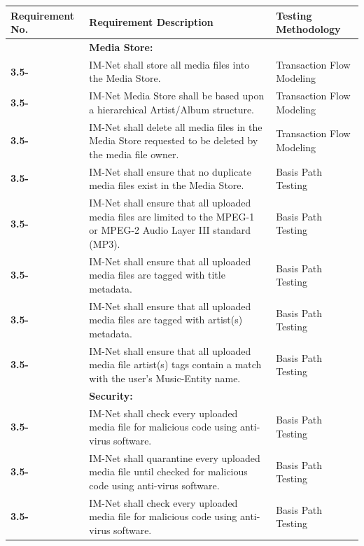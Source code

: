 \documentclass[letterpaper,12pt]{article}
\newcounter{rcounter}							%
\newcommand\rnumber{\stepcounter{rcounter}\arabic{rcounter}}
\begin{document}
{\begin{center}
\begin{tabular}{|l|p{4in}|p{2in}|}
\end{tabular} 
\end{center}

\setcounter{rcounter}{0}
\begin{center}
\begin{tabular}{|l|p{4in}|p{2in}|}
\hline 
Requirement No. & Requirement Description & Testing Methodology \\
\hline
& \textbf{Media Store:} & \\
\hline
\textbf{3.5-\rnumber} & IM-Net shall store all media files into the Media Store. & Transaction Flow Modeling \\ 
\hline
\textbf{3.5-\rnumber} & IM-Net Media Store shall be based upon a hierarchical Artist/Album structure. & Transaction Flow Modeling \\ 
\hline
\textbf{3.5-\rnumber} & IM-Net shall delete all media files in the Media Store requested to be deleted by the media file owner. & Transaction Flow Modeling \\ 
\hline
\textbf{3.5-\rnumber} & IM-Net shall ensure that no duplicate media files exist in the Media Store. & Basis Path Testing \\ 
\hline
\textbf{3.5-\rnumber} & IM-Net shall ensure that all uploaded media files are limited to the MPEG-1 or MPEG-2 Audio Layer III standard (MP3). & Basis Path Testing \\ 
\hline
\textbf{3.5-\rnumber} & IM-Net shall ensure that all uploaded media files are tagged with title metadata. & Basis Path Testing \\ 
\hline
\textbf{3.5-\rnumber} & IM-Net shall ensure that all uploaded media files are tagged with artist(s) metadata. & Basis Path Testing \\ 
\hline
\textbf{3.5-\rnumber} & IM-Net shall ensure that all uploaded media file artist(s) tags contain a match with the user's Music-Entity name. & Basis Path Testing \\ 
\hline
& \textbf{Security:} & \\
\hline
\textbf{3.5-\rnumber} & IM-Net shall check every uploaded media file for malicious code using anti-virus software. & Basis Path Testing \\ 
\hline
\textbf{3.5-\rnumber} & IM-Net shall quarantine every uploaded media file until checked for malicious code using anti-virus software. & Basis Path Testing \\ 
\hline
\textbf{3.5-\rnumber} & IM-Net shall check every uploaded media file for malicious code using anti-virus software. & Basis Path Testing \\ 

\end{tabular}
\end{center}}
\end{document}
